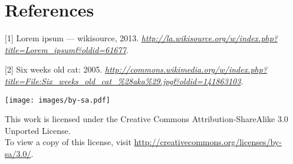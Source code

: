 \documentclass[12pt,twocolumn]{article}
\begin{document}
\section*{References}\label{references}

{[}1{]} Lorem ipsum --- wikisource, 2013.
\emph{\url{http://la.wikisource.org/w/index.php?title=Lorem_ipsum\&oldid=61677}}.

{[}2{]} Six weeks old cat: 2005.
\emph{\url{http://commons.wikimedia.org/w/index.php?title=File:Six_weeks_old_cat_\%28aka\%29.jpg\&oldid=141863103}}.

\begin{center}
  \texttt{[image: images/by-sa.pdf]}
  
  \scriptsize This work is licensed under the Creative Commons
  Attribution-ShareAlike 3.0 Unported License.\\ To view a copy
  of this license, visit
  \url{http://creativecommons.org/licenses/by-sa/3.0/}.
\end{center}
\end{document}
